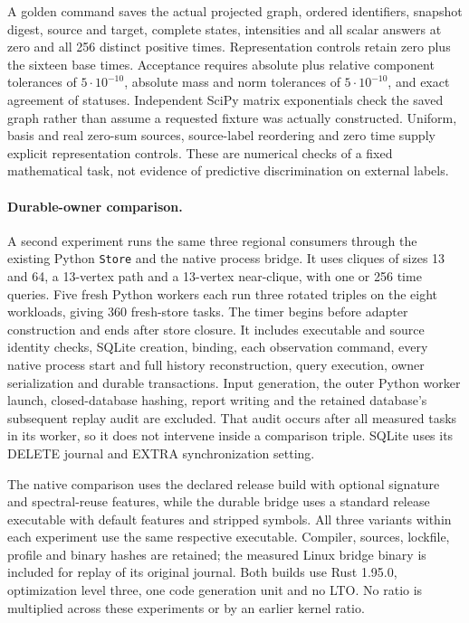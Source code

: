 \documentclass[11pt,a4paper]{article}
\theoremstyle{definition}\newtheorem{definition}[theorem]{Definition}
\begin{document}
A golden command saves the actual projected graph, ordered identifiers,
snapshot digest, source and target, complete states, intensities and all scalar
answers at zero and all 256 distinct positive times. Representation controls retain zero plus the sixteen base times. Acceptance requires absolute
plus relative component tolerances of $5\cdot10^{-10}$, absolute mass and norm
tolerances of $5\cdot10^{-10}$, and exact agreement of statuses. Independent
SciPy matrix exponentials check the saved graph rather than assume a requested
fixture was actually constructed. Uniform, basis and real zero-sum sources,
source-label reordering and zero time supply explicit representation controls.
These are numerical checks of a fixed mathematical task, not evidence of
predictive discrimination on external labels.

\paragraph{Durable-owner comparison.}
A second experiment runs the same three regional consumers through the
existing Python \texttt{Store} and the native process bridge. It uses cliques
of sizes 13 and 64, a 13-vertex path and a 13-vertex near-clique, with one or
256 time queries. Five fresh Python workers each run three rotated triples
on the eight workloads, giving 360 fresh-store tasks. The timer begins before
adapter construction and ends after store closure. It includes executable and
source identity checks, SQLite creation, binding, each observation command,
every native process start and full history reconstruction, query execution,
owner serialization and durable transactions. Input generation, the outer
Python worker launch, closed-database hashing, report writing and the retained
database's subsequent replay audit are excluded. That audit occurs after all
measured tasks in its worker, so it does not intervene inside a comparison
triple. SQLite uses its DELETE journal and EXTRA synchronization setting.

The native comparison uses the declared release build with optional signature
and spectral-reuse features, while the durable bridge uses a standard release
executable with default features and stripped symbols. All three variants
within each experiment use the same respective executable. Compiler, sources,
lockfile, profile and binary hashes are retained; the measured Linux bridge
binary is included for replay of its original journal. Both builds use Rust
1.95.0, optimization level three, one code generation unit and no LTO. No
ratio is multiplied across these experiments or by an earlier kernel ratio.
\end{document}
